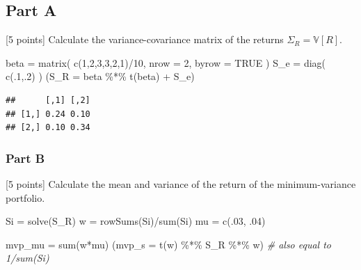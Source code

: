 \documentclass[
  oneside]{book}
\newenvironment{Shaded}{\begin{snugshade}}{\end{snugshade}}
\newcommand{\AttributeTok}[1]{\textcolor[rgb]{0.77,0.63,0.00}{#1}}
\newcommand{\CommentTok}[1]{\textcolor[rgb]{0.56,0.35,0.01}{\textit{#1}}}
\newcommand{\ConstantTok}[1]{\textcolor[rgb]{0.00,0.00,0.00}{#1}}
\newcommand{\DecValTok}[1]{\textcolor[rgb]{0.00,0.00,0.81}{#1}}
\newcommand{\FunctionTok}[1]{\textcolor[rgb]{0.00,0.00,0.00}{#1}}
\newcommand{\NormalTok}[1]{#1}
\newcommand{\OtherTok}[1]{\textcolor[rgb]{0.56,0.35,0.01}{#1}}
\newcommand{\SpecialCharTok}[1]{\textcolor[rgb]{0.00,0.00,0.00}{#1}}
\begin{document}
\hypertarget{part-a-16}{%
\subsection{Part A}\label{part-a-16}}

{[}5 points{]} Calculate the variance-covariance matrix of the returns \(\Sigma_R = \mathbb{V}[R]\).

\begin{Shaded}
\begin{Highlighting}[]
\NormalTok{beta }\OtherTok{=} \FunctionTok{matrix}\NormalTok{( }\FunctionTok{c}\NormalTok{(}\DecValTok{1}\NormalTok{,}\DecValTok{2}\NormalTok{,}\DecValTok{3}\NormalTok{,}\DecValTok{3}\NormalTok{,}\DecValTok{2}\NormalTok{,}\DecValTok{1}\NormalTok{)}\SpecialCharTok{/}\DecValTok{10}\NormalTok{, }\AttributeTok{nrow =} \DecValTok{2}\NormalTok{, }\AttributeTok{byrow =} \ConstantTok{TRUE}\NormalTok{ )}
\NormalTok{S\_e }\OtherTok{=} \FunctionTok{diag}\NormalTok{( }\FunctionTok{c}\NormalTok{(.}\DecValTok{1}\NormalTok{,.}\DecValTok{2}\NormalTok{) )}
\NormalTok{(}\AttributeTok{S\_R =}\NormalTok{ beta }\SpecialCharTok{\%*\%} \FunctionTok{t}\NormalTok{(beta) }\SpecialCharTok{+}\NormalTok{ S\_e)}
\end{Highlighting}
\end{Shaded}

\begin{verbatim}
##      [,1] [,2]
## [1,] 0.24 0.10
## [2,] 0.10 0.34
\end{verbatim}

\hypertarget{part-b-15}{%
\subsubsection{Part B}\label{part-b-15}}

{[}5 points{]} Calculate the mean and variance of the return of the minimum-variance portfolio.

\begin{Shaded}
\begin{Highlighting}[]
\NormalTok{Si }\OtherTok{=} \FunctionTok{solve}\NormalTok{(S\_R)}
\NormalTok{w }\OtherTok{=} \FunctionTok{rowSums}\NormalTok{(Si)}\SpecialCharTok{/}\FunctionTok{sum}\NormalTok{(Si)}
\NormalTok{mu }\OtherTok{=} \FunctionTok{c}\NormalTok{(.}\DecValTok{03}\NormalTok{, .}\DecValTok{04}\NormalTok{)}

\NormalTok{mvp\_mu }\OtherTok{=} \FunctionTok{sum}\NormalTok{(w}\SpecialCharTok{*}\NormalTok{mu)}
\NormalTok{(}\AttributeTok{mvp\_s =}  \FunctionTok{t}\NormalTok{(w) }\SpecialCharTok{\%*\%}\NormalTok{ S\_R }\SpecialCharTok{\%*\%}\NormalTok{ w) }\CommentTok{\# also equal to 1/sum(Si)}
\end{Highlighting}
\end{Shaded}
\end{document}
